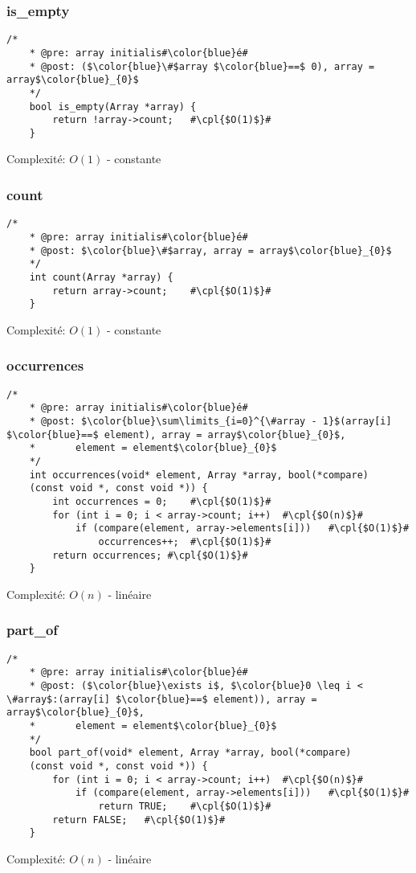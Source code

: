 \documentclass[a4paper, 11pt, oneside]{article}
\begin{document}
	\subsubsection{is\_empty}
	\begin{lstlisting}[mathescape]
	/*
	* @pre: array initialis#\color{blue}é#
	* @post: ($\color{blue}\#$array $\color{blue}==$ 0), array = array$\color{blue}_{0}$
	*/
	bool is_empty(Array *array) {
		return !array->count;	#\cpl{$O(1)$}#
	}
	\end{lstlisting}
	Complexité: $O(1)$ - constante
	
	\subsubsection{count}
	\begin{lstlisting}[mathescape]
	/*
	* @pre: array initialis#\color{blue}é#
	* @post: $\color{blue}\#$array, array = array$\color{blue}_{0}$
	*/
	int count(Array *array) {
		return array->count;	#\cpl{$O(1)$}#
	}
	\end{lstlisting}
	Complexité: $O(1)$ - constante
	
	\clearpage
	\subsubsection{occurrences}
	\begin{lstlisting}[mathescape]
	/*
	* @pre: array initialis#\color{blue}é#
	* @post: $\color{blue}\sum\limits_{i=0}^{\#array - 1}$(array[i] $\color{blue}==$ element), array = array$\color{blue}_{0}$,
	*		element = element$\color{blue}_{0}$
	*/
	int occurrences(void* element, Array *array, bool(*compare)
	(const void *, const void *)) {
		int occurrences = 0;	#\cpl{$O(1)$}#
		for (int i = 0; i < array->count; i++)	#\cpl{$O(n)$}#
			if (compare(element, array->elements[i]))	#\cpl{$O(1)$}#
				occurrences++;	#\cpl{$O(1)$}#
		return occurrences;	#\cpl{$O(1)$}#
	}
	\end{lstlisting}
	Complexité: $O(n)$ - linéaire
	
	\subsubsection{part\_of}
	\begin{lstlisting}[mathescape]
	/*
	* @pre: array initialis#\color{blue}é#
	* @post: ($\color{blue}\exists i$, $\color{blue}0 \leq i < \#array$:(array[i] $\color{blue}==$ element)), array = array$\color{blue}_{0}$,
	*		element = element$\color{blue}_{0}$
	*/
	bool part_of(void* element, Array *array, bool(*compare)    
	(const void *, const void *)) {
		for (int i = 0; i < array->count; i++)	#\cpl{$O(n)$}#
			if (compare(element, array->elements[i]))	#\cpl{$O(1)$}#
				return TRUE;	#\cpl{$O(1)$}#
		return FALSE;	#\cpl{$O(1)$}#
	}
	\end{lstlisting}
	Complexité: $O(n)$ - linéaire
	
\end{document}
